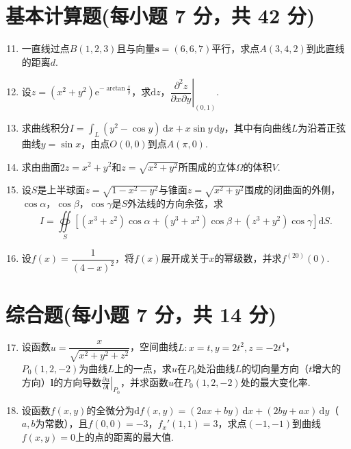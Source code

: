 \documentclass[../main.tex]{subfiles}
\begin{document}
\section{基本计算题(每小题 7 分，共 42 分)}
\begin{enumerate}
    \setcounter{enumi}{10}
    \item 一直线过点$B(1,2,3)$且与向量$\boldsymbol{s}=(6,6,7)$平行，求点$A(3,4,2)$到此直线的距离$d$.
          \vspace{12em}
    \item 设$z=(x^2+y^2)\mathrm{e}^{-\arctan\frac{x}{y}}$，求$\mathrm{d}z$，$\left.\dfrac{\partial^2z}{\partial x\partial y}\right|_{(0,1)}$.
          \vspace{9em}
    \item 求曲线积分$I=\displaystyle\int_L(y^2-\cos y)\,\mathrm{d}x+x\sin y\,\mathrm{d}y$，其中有向曲线$L$为沿着正弦曲线$y=\sin x$，由点$O(0,0)$到点$A(\pi,0)$.
          \vspace{9em}
    \item 求由曲面$2z=x^2+y^2$和$z=\sqrt{x^2+y^2}$所围成的立体$\Omega$的体积$V$.
          \vspace{9em}
    \item 设$S$是上半球面$z=\sqrt{1-x^2-y^2}$与锥面$z=\sqrt{x^2+y^2}$围成的闭曲面的外侧，$\cos\alpha$，$\cos\beta$，$\cos\gamma$是$S$外法线的方向余弦，求
          \[I=\oiint\limits_{S}[(x^3+z^2)\cos\alpha+(y^3+x^2)\cos\beta+(z^3+y^2)\cos\gamma]\mathrm{d}S.\]
          \vspace{8em}
    \item 设$f(x)=\dfrac1{(4-x)^2}$，将$f(x)$展开成关于$x$的幂级数，并求$f^{(20)}(0)$.
          \vspace{9em}
\end{enumerate}

\section{综合题(每小题 7 分，共 14 分)}
\begin{enumerate}
    \setcounter{enumi}{16}
    \item 设函数$u=\dfrac{x}{\sqrt{x^2+y^2+z^2}}$，空间曲线$L:x=t,y=2t^2,z=-2t^4$，$P_0(1,2,-2)$为曲线$L$上的一点，求$u$在$P_0$处沿曲线$L$的切向量方向（$t$增大的方向）$\boldsymbol{l}$的方向导数$\left.\frac{\partial u}{\partial \boldsymbol{l}}\right|_{P_0}$，并求函数$u$在$P_0(1,2,-2)$处的最大变化率.
          \vspace{9em}
    \item 设函数$f(x,y)$的全微分为$\mathrm{d}f(x,y)=(2ax+by)\,\mathrm{d}x+(2by+ax)\,\mathrm{d}y$（$a,b$为常数），且$f(0,0)=-3$，$f_x'(1,1)=3$，求点$(-1,-1)$到曲线$f(x,y)=0$上的点的距离的最大值.
          \vspace{10em}
\end{enumerate}
\end{document}
